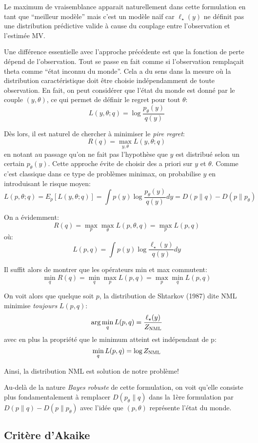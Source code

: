 \documentclass{article}
\begin{document}
Le maximum de vraisemblance apparait naturellement dans cette formulation en tant que ``meilleur mod\`ele'' mais c'est un mod\`ele na\"if car $\ell_\star(y)$ ne d\'efinit pas une distribution pr\'edictive valide \`a cause du couplage entre l'observation et l'estim\'ee MV. 

Une diff\'erence essentielle avec l'approche pr\'ec\'edente est que la fonction de perte d\'epend de l'observation. Tout se passe en fait comme si l'observation rempla\c{c}ait theta comme ``\'etat inconnu du monde''. Cela a du sens dans la mesure o\`u la distribution caract\'eristique doit \^etre choisie ind\'ependamment de toute observation. En fait, on peut consid\'erer que l'\'etat du monde est donn\'e par le couple $(y, \theta)$, ce qui permet de d\'efinir le regret pour tout $\theta$: 
$$
L(y, \theta; q) = \log \frac{p_\theta(y)}{q(y)}
$$ 

D\`es lors, il est naturel de chercher \`a minimiser le {\em pire regret}: 
$$
R(q) = \max_{y, \theta} L(y, \theta; q)
$$ 
en notant au passage qu'on ne fait pas l'hypoth\`ese que $y$ est distribu\'e selon un certain $p_\theta(y)$. Cette approche \'evite de choisir des a priori sur $y$ et $\theta$. Comme c'est classique dans ce type de probl\`emes minimax, on probabilise $y$ en introduisant le risque moyen:
$$
L(p, \theta; q) 
= E_p [L(y, \theta; q)] 
= \int p(y) \log \frac{p_\theta(y)}{q(y)} dy 
= D(p\|q) - D(p\|p_\theta) 
$$ 

On a \'evidemment: 
$$R(q) = \max_p \max_\theta L(p, \theta, q) = \max_p L(p, q)$$ 
o\`u: 
$$L(p, q) = \int p(y) \log \frac{\ell_\star(y)}{q(y)} dy$$ 

Il suffit alors de montrer que les op\'erateurs min et max commutent:  
$$\min_q R(q) = \min_q \max_p L(p, q) = \max_p \min_q L(p, q)$$ 

On voit alors que quelque soit $p$, la distribution de Shtarkov (1987) dite NML minimise {\em toujours} $L(p, q)$: 
$$\arg\min_q L(p, q) = \frac{\ell_\star(y)}{Z_{\rm NML}}$$ 
avec en plus la propri\'et\'e que le minimum atteint est ind\'ependant de p: 
$$\min_q L(p, q) = \log Z_{\rm NML}$$

Ainsi, la distribution NML est solution de notre probl\`eme! 

Au-del\`a de la nature {\em Bayes robuste} de cette formulation, on voit qu'elle consiste plus fondamentalement \`a remplacer $D(p_\theta\|q)$ dans la 1\`ere formulation par $D(p\|q) - D(p\|p_\theta)$ avec l'id\'ee que $(p,\theta)$ repr\'esente l'\'etat du monde. 


\subsection{Crit\`ere d'Akaike}
\end{document}
